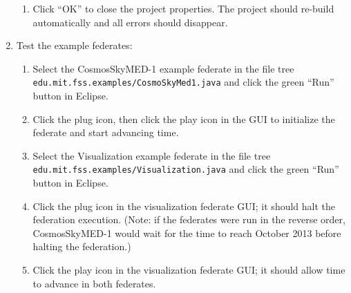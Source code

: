 \documentclass[]{article}
\begin{document}
\begin{enumerate}
\begin{enumerate}
\item Click ``OK'' to close the project properties. The project should re-build automatically and all errors should disappear.
\end{enumerate}
\item Test the example federates:
\begin{enumerate}
\item Select the CosmosSkyMED-1 example federate in the file tree \\ \texttt{edu.mit.fss.examples/CosmoSkyMed1.java} and click the green ``Run'' button in Eclipse.
\item Click the plug icon, then click the play icon in the GUI to initialize the federate and start advancing time.
\item Select the Visualization example federate in the file tree \\ \texttt{edu.mit.fss.examples/Visualization.java} and click the green ``Run'' button in Eclipse.
\item Click the plug icon in the visualization federate GUI; it should halt the federation execution. (Note: if the federates were run in the reverse order, CosmosSkyMED-1 would wait for the time to reach October 2013 before halting the federation.)
\item Click the play icon in the visualization federate GUI; it should allow time to advance in both federates.
\end{enumerate}
\end{enumerate}
\end{document}
